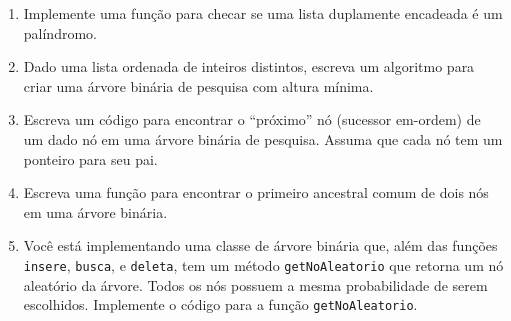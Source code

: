 \documentclass[fleqn]{article}
\begin{document}
\begin{enumerate}
   \item{
      Implemente uma função para checar se uma lista duplamente encadeada é um palíndromo.
   }

   \item{
      Dado uma lista ordenada de inteiros distintos, escreva um algoritmo para criar uma árvore binária de pesquisa com altura mínima.
   }

   \item{
      Escreva um código para encontrar o ``próximo'' nó (sucessor em-ordem) de um dado nó em uma árvore binária de pesquisa. Assuma que cada nó tem um ponteiro para seu pai.
   }

   \item{
      Escreva uma função para encontrar o primeiro ancestral comum de dois nós em uma árvore binária.
   }

   \item{
      Você está implementando uma classe de árvore binária que, além das funções \texttt{insere}, \texttt{busca}, e \texttt{deleta}, tem um método \texttt{getNoAleatorio} que retorna um nó aleatório da árvore. Todos os nós possuem a mesma probabilidade de serem escolhidos. Implemente o código para a função \texttt{getNoAleatorio}.
   }

\end{enumerate}

\pagebreak
{}
\end{document}
